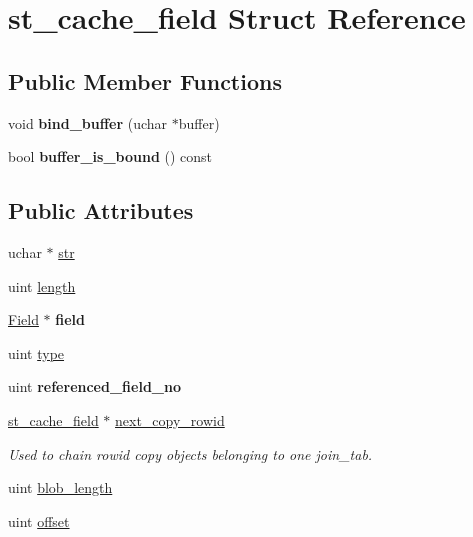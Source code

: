\hypertarget{structst__cache__field}{}\section{st\+\_\+cache\+\_\+field Struct Reference}
\label{structst__cache__field}
\subsection*{Public Member Functions}
\begin{DoxyCompactItemize}
\item 
\mbox{\label{structst__cache__field_a353553ff9d0a51b4b1f1ceb0ec348b02}} 
void {\bfseries bind\+\_\+buffer} (uchar $\ast$buffer)
\item 
\mbox{\label{structst__cache__field_ae21d19fad68e623472a877e6028ba9de}} 
bool {\bfseries buffer\+\_\+is\+\_\+bound} () const
\end{DoxyCompactItemize}
\subsection*{Public Attributes}
\begin{DoxyCompactItemize}
\item 
uchar $\ast$ \mbox{\hyperlink{structst__cache__field_aeede2018648d74955d91a7eb57e9c4a0}{str}}
\item 
uint \mbox{\hyperlink{structst__cache__field_a67a73fba8fa7590fa1a9b21c2d63abc4}{length}}
\item 
\mbox{\label{structst__cache__field_a91527f6636736e6e17c40d9fee8613c5}} 
\mbox{\hyperlink{classField}{Field}} $\ast$ {\bfseries field}
\item 
uint \mbox{\hyperlink{structst__cache__field_ae77e55995e7aa98b23bd4456b0c5abea}{type}}
\item 
\mbox{\label{structst__cache__field_ac1606da5a2276eba9eaf29360b12fd46}} 
uint {\bfseries referenced\+\_\+field\+\_\+no}
\item 
\mbox{\label{structst__cache__field_a5bc2502cd9ab6fc1c778be3478ff128d}} 
\mbox{\hyperlink{structst__cache__field}{st\+\_\+cache\+\_\+field}} $\ast$ \mbox{\hyperlink{structst__cache__field_a5bc2502cd9ab6fc1c778be3478ff128d}{next\+\_\+copy\+\_\+rowid}}
\begin{DoxyCompactList}\small\item\em Used to chain rowid copy objects belonging to one join\+\_\+tab. \end{DoxyCompactList}\item 
uint \mbox{\hyperlink{structst__cache__field_aabc6d11ce585aa7f00007e1e98de21b7}{blob\+\_\+length}}
\item 
uint \mbox{\hyperlink{structst__cache__field_a7195e3606c4f7bbf1edc3616600d8b29}{offset}}
\end{DoxyCompactItemize}


